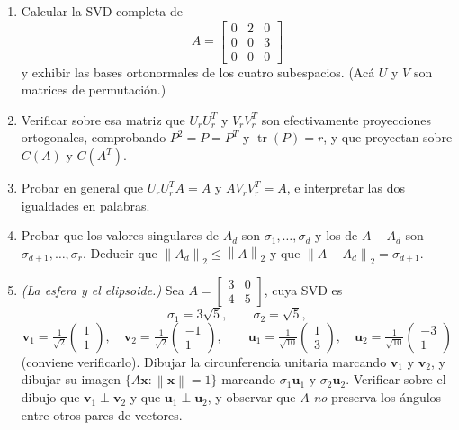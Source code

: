 \documentclass[11pt,a4paper]{article}
\newcommand{\bi}[1]{\boldsymbol{#1}}
\DeclareMathOperator{\tr}{tr}
\newcommand{\norm}[1]{\left\|#1\right\|}
\newcommand{\normdos}[1]{\left\|#1\right\|_{2}}
\begin{document}
\begin{enumerate}[label=\textbf{(\alph*)},itemsep=4pt,topsep=4pt]
\item Calcular la SVD completa de
\[
A=\begin{bmatrix}0&2&0\\ 0&0&3\\ 0&0&0\end{bmatrix}
\]
y exhibir las bases ortonormales de los cuatro subespacios. (Acá $U$ y $V$
son matrices de permutación.)

\item Verificar sobre esa matriz que $U_rU_r^T$ y $V_rV_r^T$ son
efectivamente proyecciones ortogonales, comprobando $P^2=P=P^T$ y
$\tr(P)=r$, y que proyectan sobre $C(A)$ y $C(A^T)$.

\item Probar en general que $U_rU_r^TA=A$ y $AV_rV_r^T=A$, e interpretar las
dos igualdades en palabras.

\item Probar que los valores singulares de $A_d$ son
$\sigma_1,\dots,\sigma_d$ y los de $A-A_d$ son
$\sigma_{d+1},\dots,\sigma_r$. Deducir que $\normdos{A_d}\le\normdos{A}$ y
que $\normdos{A-A_d}=\sigma_{d+1}$.

\item \emph{(La esfera y el elipsoide.)} Sea
$A=\begin{bmatrix}3&0\\ 4&5\end{bmatrix}$, cuya SVD es
\[
\sigma_1=3\sqrt5,\qquad \sigma_2=\sqrt5,
\]
\[
\bi v_1=\tfrac1{\sqrt2}\begin{pmatrix}1\\ 1\end{pmatrix},\quad
\bi v_2=\tfrac1{\sqrt2}\begin{pmatrix}-1\\ 1\end{pmatrix},\qquad
\bi u_1=\tfrac1{\sqrt{10}}\begin{pmatrix}1\\ 3\end{pmatrix},\quad
\bi u_2=\tfrac1{\sqrt{10}}\begin{pmatrix}-3\\ 1\end{pmatrix}
\]
(conviene verificarlo). Dibujar la circunferencia unitaria marcando $\bi v_1$
y $\bi v_2$, y dibujar su imagen $\{A\bi x:\norm{\bi x}=1\}$ marcando
$\sigma_1\bi u_1$ y $\sigma_2\bi u_2$. Verificar sobre el dibujo que
$\bi v_1\perp\bi v_2$ y que $\bi u_1\perp\bi u_2$, y observar que $A$
\emph{no} preserva los ángulos entre otros pares de vectores.
\end{enumerate}
\end{document}
